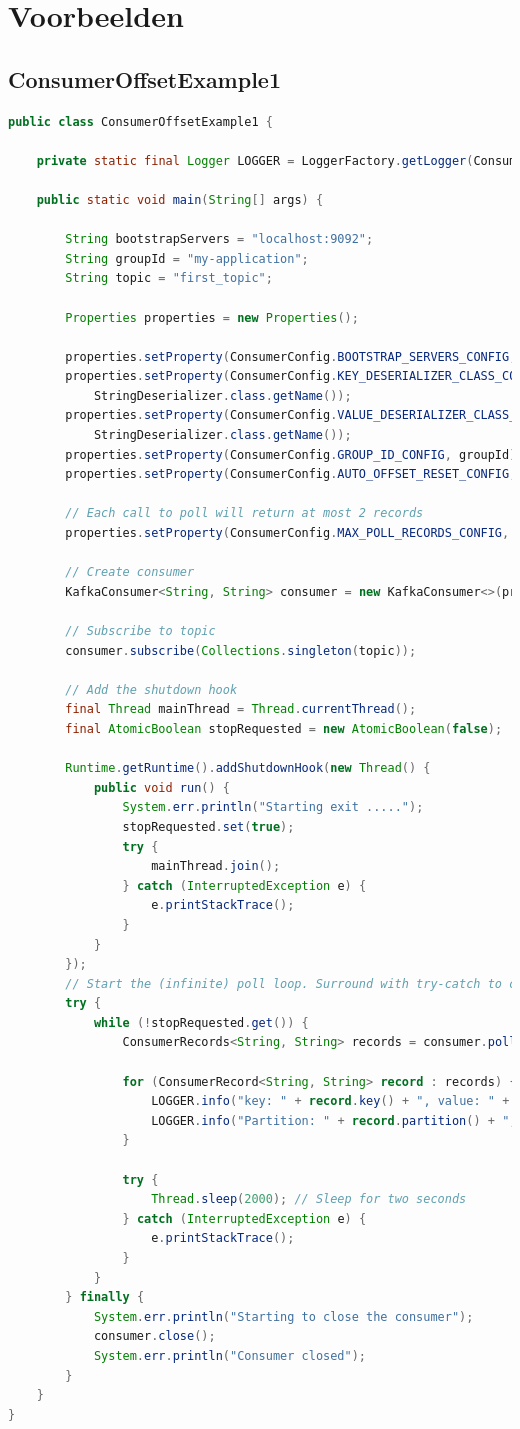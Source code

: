 \documentclass[a4paper,10pt,twoside]{report}
\begin{document}
\section{Voorbeelden}

\subsection{ConsumerOffsetExample1}

\begin{lstlisting}[language=Java]
public class ConsumerOffsetExample1 {
	
	private static final Logger LOGGER = LoggerFactory.getLogger(ConsumerOffsetExample1.class);
	
	public static void main(String[] args) {
		
		String bootstrapServers = "localhost:9092";
		String groupId = "my-application";
		String topic = "first_topic";
		
		Properties properties = new Properties();
		
		properties.setProperty(ConsumerConfig.BOOTSTRAP_SERVERS_CONFIG, bootstrapServers);
		properties.setProperty(ConsumerConfig.KEY_DESERIALIZER_CLASS_CONFIG,
			StringDeserializer.class.getName());
		properties.setProperty(ConsumerConfig.VALUE_DESERIALIZER_CLASS_CONFIG, 
			StringDeserializer.class.getName());
		properties.setProperty(ConsumerConfig.GROUP_ID_CONFIG, groupId);
		properties.setProperty(ConsumerConfig.AUTO_OFFSET_RESET_CONFIG, "earliest");
		
		// Each call to poll will return at most 2 records
		properties.setProperty(ConsumerConfig.MAX_POLL_RECORDS_CONFIG, "2"); 
		
		// Create consumer
		KafkaConsumer<String, String> consumer = new KafkaConsumer<>(properties);
		
		// Subscribe to topic
		consumer.subscribe(Collections.singleton(topic));
		
		// Add the shutdown hook
		final Thread mainThread = Thread.currentThread();
		final AtomicBoolean stopRequested = new AtomicBoolean(false);
		
		Runtime.getRuntime().addShutdownHook(new Thread() {
			public void run() {
				System.err.println("Starting exit .....");
				stopRequested.set(true);
				try {
					mainThread.join();
				} catch (InterruptedException e) {
					e.printStackTrace();
				}
			}
		});
		// Start the (infinite) poll loop. Surround with try-catch to catch the WakeupException
		try {
			while (!stopRequested.get()) {
				ConsumerRecords<String, String> records = consumer.poll(Duration.ofMillis(100));
				
				for (ConsumerRecord<String, String> record : records) {
					LOGGER.info("key: " + record.key() + ", value: " + record.value());
					LOGGER.info("Partition: " + record.partition() + ", Offset:" + record.offset());
				}
				
				try {
					Thread.sleep(2000); // Sleep for two seconds 
				} catch (InterruptedException e) {
					e.printStackTrace();
				}
			}
		} finally {
			System.err.println("Starting to close the consumer");
			consumer.close();
			System.err.println("Consumer closed");
		}		
	}
}
\end{lstlisting}
\end{document}

